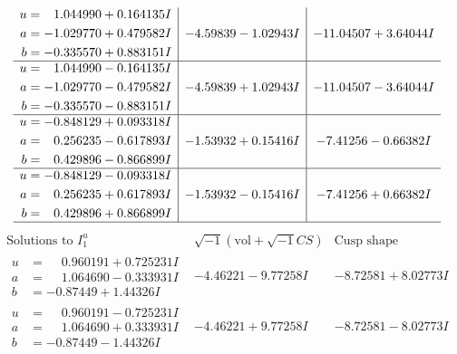 \documentclass[1p]{elsarticle_modified}
\theoremstyle{definition}
\newcommand{\I}{\sqrt{-1}}
\begin{document}
$$\begin{array}{c|c|c}
\begin{aligned}
u &= \phantom{-}1.044990 + 0.164135 I \\
a &= -1.029770 + 0.479582 I \\
b &= -0.335570 + 0.883151 I\end{aligned}
 & -4.59839 - 1.02943 I & -11.04507 + 3.64044 I \\ \hline\begin{aligned}
u &= \phantom{-}1.044990 - 0.164135 I \\
a &= -1.029770 - 0.479582 I \\
b &= -0.335570 - 0.883151 I\end{aligned}
 & -4.59839 + 1.02943 I & -11.04507 - 3.64044 I \\ \hline\begin{aligned}
u &= -0.848129 + 0.093318 I \\
a &= \phantom{-}0.256235 - 0.617893 I \\
b &= \phantom{-}0.429896 - 0.866899 I\end{aligned}
 & -1.53932 + 0.15416 I & -7.41256 - 0.66382 I \\ \hline\begin{aligned}
u &= -0.848129 - 0.093318 I \\
a &= \phantom{-}0.256235 + 0.617893 I \\
b &= \phantom{-}0.429896 + 0.866899 I\end{aligned}
 & -1.53932 - 0.15416 I & -7.41256 + 0.66382 I\\
 \hline 
 \end{array}$$\newpage$$\begin{array}{c|c|c}  
\text{Solutions to }I^u_{1}& \I (\text{vol} + \sqrt{-1}CS) & \text{Cusp shape}\\
 \hline 
\begin{aligned}
u &= \phantom{-}0.960191 + 0.725231 I \\
a &= \phantom{-}1.064690 - 0.333931 I \\
b &= -0.87449 + 1.44326 I\end{aligned}
 & -4.46221 - 9.77258 I & -8.72581 + 8.02773 I \\ \hline\begin{aligned}
u &= \phantom{-}0.960191 - 0.725231 I \\
a &= \phantom{-}1.064690 + 0.333931 I \\
b &= -0.87449 - 1.44326 I\end{aligned}
 & -4.46221 + 9.77258 I & -8.72581 - 8.02773 I \\ \hline\begin{aligned}

\end{aligned}
\end{array}$$
\end{document}
